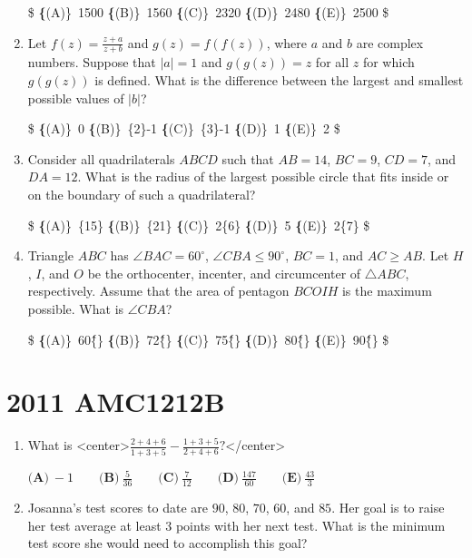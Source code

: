 \documentclass{article}
\begin{document}
\begin{enumerate}[label=\arabic*., itemsep=0.5em]
\$
\textbf\{(A)\}\ 1500 \qquad
\textbf\{(B)\}\ 1560 \qquad
\textbf\{(C)\}\ 2320 \qquad
\textbf\{(D)\}\ 2480 \qquad
\textbf\{(E)\}\ 2500 \$\par \vspace{0.5em}\item Let $f(z)= \frac{z+a}{z+b}$ and $g(z)=f(f(z))$, where $a$ and $b$ are complex numbers. Suppose that $\left| a \right| = 1$ and $g(g(z))=z$ for all $z$ for which $g(g(z))$ is defined. What is the difference between the largest and smallest possible values of $\left| b \right|$?

\$
\textbf\{(A)\}\ 0 \qquad
\textbf\{(B)\}\ \sqrt\{2\}-1 \qquad
\textbf\{(C)\}\ \sqrt\{3\}-1 \qquad
\textbf\{(D)\}\ 1 \qquad
\textbf\{(E)\}\ 2 \$\par \vspace{0.5em}\item Consider all quadrilaterals $ABCD$ such that $AB=14$, $BC=9$, $CD=7$, and $DA=12$. What is the radius of the largest possible circle that fits inside or on the boundary of such a quadrilateral?

\$
\textbf\{(A)\}\ \sqrt\{15\} \qquad
\textbf\{(B)\}\ \sqrt\{21\} \qquad
\textbf\{(C)\}\ 2\sqrt\{6\} \qquad
\textbf\{(D)\}\ 5 \qquad
\textbf\{(E)\}\ 2\sqrt\{7\} \$\par \vspace{0.5em}\item Triangle $ABC$ has $\angle BAC = 60^{\circ}$, $\angle CBA \leq 90^{\circ}$, $BC=1$, and $AC \geq AB$. Let $H$, $I$, and $O$ be the orthocenter, incenter, and circumcenter of $\triangle ABC$, respectively. Assume that the area of pentagon $BCOIH$ is the maximum possible. What is $\angle CBA$?

\$
\textbf\{(A)\}\ 60\^\{\circ\} \qquad
\textbf\{(B)\}\ 72\^\{\circ\} \qquad
\textbf\{(C)\}\ 75\^\{\circ\} \qquad
\textbf\{(D)\}\ 80\^\{\circ\} \qquad
\textbf\{(E)\}\ 90\^\{\circ\} \$\par \vspace{0.5em}\end{enumerate}\newpage\section*{2011 AMC1212B}\begin{enumerate}[label=\arabic*., itemsep=0.5em]\item What is <center>$ \frac{2+4+6}{1+3+5}-\frac{1+3+5}{2+4+6}? $</center>


$\textbf{(A)}\ -1 \qquad \textbf{(B)}\ \frac{5}{36} \qquad \textbf{(C)}\ \frac{7}{12} \qquad \textbf{(D)}\ \frac{147}{60} \qquad \textbf{(E)}\ \frac{43}{3}$\par \vspace{0.5em}\item Josanna's test scores to date are $90$, $80$, $70$, $60$, and $85$.  Her goal is to raise her test average at least $3$ points with her next test.  What is the minimum test score she would need to accomplish this goal?


\end{enumerate}
\end{document}
